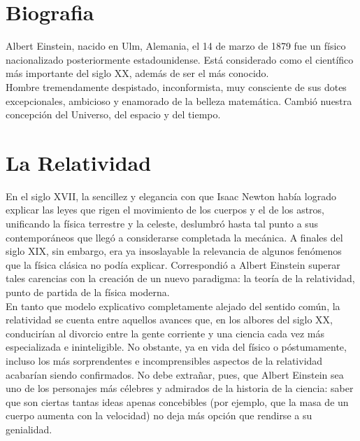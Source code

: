\documentclass[a4paper,openright,12pt]{report}
\begin{document}
\begin{titlepage}
\tableofcontents
\begin{large}
\chapter{Biografia}
\begin{flushleft}
Albert Einstein, nacido en Ulm, Alemania, el 14 de marzo de 1879 fue un físico nacionalizado posteriormente estadounidense. Está considerado como el científico más importante del siglo XX, además de ser el más conocido.\\

Hombre tremendamente despistado, inconformista, muy consciente de sus dotes excepcionales, ambicioso y enamorado de la belleza matemática. Cambió nuestra concepción del Universo, del espacio y del tiempo.\\
\end{flushleft}


\chapter{La Relatividad}\label{cap.nudo}
\begin{flushleft}
En el siglo XVII, la sencillez y elegancia con que Isaac Newton había logrado explicar las leyes que rigen el movimiento de los cuerpos y el de los astros, unificando la física terrestre y la celeste, deslumbró hasta tal punto a sus contemporáneos que llegó a considerarse completada la mecánica. A finales del siglo XIX, sin embargo, era ya insoslayable la relevancia de algunos fenómenos que la física clásica no podía explicar. Correspondió a Albert Einstein superar tales carencias con la creación de un nuevo paradigma: la teoría de la relatividad, punto de partida de la física moderna.\\
En tanto que modelo explicativo completamente alejado del sentido común, la relatividad se cuenta entre aquellos avances que, en los albores del siglo XX, conducirían al divorcio entre la gente corriente y una ciencia cada vez más especializada e ininteligible. No obstante, ya en vida del físico o póstumamente, incluso los más sorprendentes e incomprensibles aspectos de la relatividad acabarían siendo confirmados. No debe extrañar, pues, que Albert Einstein sea uno de los personajes más célebres y admirados de la historia de la ciencia: saber que son ciertas tantas ideas apenas concebibles (por ejemplo, que la masa de un cuerpo aumenta con la velocidad) no deja más opción que rendirse a su genialidad.\\


\end{flushleft}
\end{large}
\end{titlepage}
\end{document}
